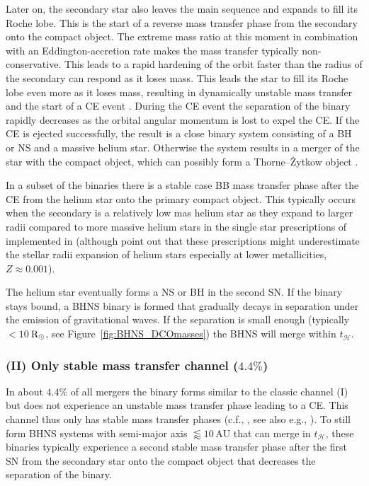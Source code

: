 \documentclass[twocolumn]{aastex63}
\newcommand{\floor}[1]{\textbf{\textcolor{magenta}{[Floor: #1]}}}
\newcommand\COMPAS{{\sc{COMPAS }}}
\newcommand\bhnsSingle{BHNS\xspace}
\newcommand\PercentageBnoCE{$4.4\%$\xspace}
\newcommand{\Rsun}{\ensuremath{\,\rm{R}_{\odot}}\xspace}
\newcommand{\AU}{\ensuremath{\,\mathrm{AU}}\xspace}
\newcommand{\thubble}{\ensuremath{{t}_{\mathcal{H}}}\xspace}
\begin{document}
Later on, the secondary star also leaves the main sequence and expands to fill its Roche lobe.  This is the start of a reverse mass transfer phase from the secondary onto the compact object. 
 The extreme mass ratio at this moment in combination with an Eddington-accretion rate makes the mass transfer typically  non-conservative. This leads to a rapid hardening of the orbit faster than the radius of the secondary can respond as it loses mass. This leads the star to fill its Roche lobe even more as it loses mass,  resulting in dynamically unstable mass transfer and the start of a \ac{CE} event  \citep[e.g.][]{1997A&A...327..620S,2010ApJ...717..724G,2015ApJ...812...40G,2018MNRAS.481.4009V}.  During the \ac{CE} event  the separation of the binary rapidly decreases as the orbital angular momentum is lost to expel the CE.  If the \ac{CE} is ejected successfully, the result is a   close binary system consisting of a  \ac{BH} or \ac{NS} and a massive helium star.  Otherwise the system results in a merger of the star with the compact object, which can possibly form a  Thorne--{\.Z}ytkow object \citep{1977ApJ...212..832T}. %
 
In a subset of the binaries there is a stable case BB  mass transfer phase after the \ac{CE} from the helium star onto the primary compact object.  This typically occurs when the secondary is a relatively low mas helium star as they expand to larger radii compared to more massive helium stars in the single star prescriptions of \citet{2000MNRAS.315..543H} implemented in \COMPAS (although  \citealt{2020arXiv200301120L}  point out that these prescriptions might underestimate  the stellar radii expansion of helium stars especially at lower metallicities, $Z \approx 0.001$). 

The helium star eventually forms a \ac{NS} or BH in the second \ac{SN}.   If the binary stays bound, a \bhnsSingle  binary is formed that gradually decays in separation under the emission of gravitational waves.  If the separation is small enough (typically $<10$\Rsun, see Figure~\ref{fig:BHNS_DCOmasses}) the \bhnsSingle will merge within \thubble.  
 
%
\subsubsection{(II) Only stable mass transfer channel (\PercentageBnoCE)}
%
In  about \PercentageBnoCE{}  of all  mergers the binary forms  similar to the classic channel (I) but does not experience an unstable mass transfer phase leading to a \ac{CE}. 
This channel thus only has  stable mass transfer phases    (c.f., \citealt[][]{Heuvel:2017sfe, 2019MNRAS.490.3740N}, see also e.g., \citealt[][]{2017MNRAS.465.2092P}). 
To still form  \bhnsSingle systems with semi-major axis $\lessapprox 10$\AU that can merge in \thubble, these  binaries typically experience a second stable mass transfer phase after the first  \ac{SN} from the secondary star onto the compact object that decreases the separation of the binary. 
\end{document}
